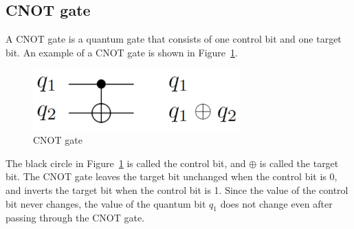 \subsection{CNOT gate}
A CNOT gate is a quantum gate that consists of one control bit and one target bit.
An example of a CNOT gate is shown in
Figure~\ref{cnot_gate}.
\begin{figure}[tbp]
\centering
\includegraphics[width=8cm]{img/cnotgate.pdf}
\caption{CNOT gate}
\label{cnot_gate}
\end{figure}
The black circle in Figure~\ref{cnot_gate} is called the control bit,
and $\oplus$ is called the target bit.
The CNOT gate leaves the target bit unchanged when the control bit is 0, and inverts the target bit when the control bit is 1.
Since the value of the control bit never changes,
the value of the quantum bit $q_{1}$ does not change even after passing through the CNOT gate.

